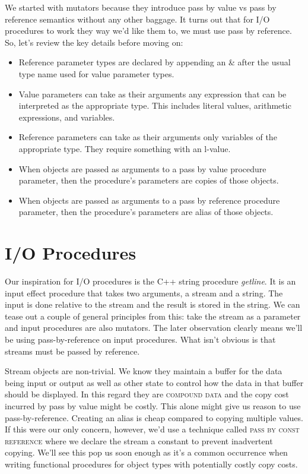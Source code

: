 \documentclass[nobib]{tufte-handout}
\begin{document}
We started with mutators because they introduce pass by value vs pass by reference semantics without any other baggage. It turns out that for I/O procedures to work they way we'd like them to, we must use pass by reference. So, let's review the key details before moving on:
\begin{itemize}
\item Reference parameter types are declared by appending an \& after the usual type name used for value parameter types.

\item Value parameters can take as their arguments any expression that can be interpreted as the appropriate type. This includes literal values, arithmetic expressions, and variables. 

\item Reference parameters can take as their arguments only variables of the appropriate type. They require something with an l-value. 

\item When objects are passed as arguments to a pass by value procedure parameter, then the procedure's parameters are copies of those objects. 

\item When objects are passed as arguments to a pass by reference procedure parameter, then the procedure's parameters are alias of those objects.

\end{itemize} 

\section{ I/O Procedures }

Our inspiration for I/O procedures is the C++ string procedure \textit{getline}. It is an input effect procedure that takes two arguments, a stream and a string. The input is done relative to the stream and the result is stored in the string. We can tease out a couple of general principles from this: take the stream as a parameter and input procedures are also mutators. The later observation clearly means we'll be using pass-by-reference on input procedures. What isn't obvious is that streams must be passed by reference. 

Stream objects are non-trivial. We know they maintain a buffer for the data being input or output as well as other state to control how the data in that buffer should be displayed. In this regard they are \textsc{compound data} and the copy cost incurred by pass by value might be costly. This alone might give us reason to use pass-by-reference. Creating an alias is cheap compared to copying multiple values.  If this were our only concern, however, we'd use a technique called \textsc{pass by const reference} where we declare the stream a constant to prevent inadvertent copying. We'll see this pop us soon enough as it's a common occurrence when writing functional procedures for object types with potentially costly copy costs. 
\end{document}
